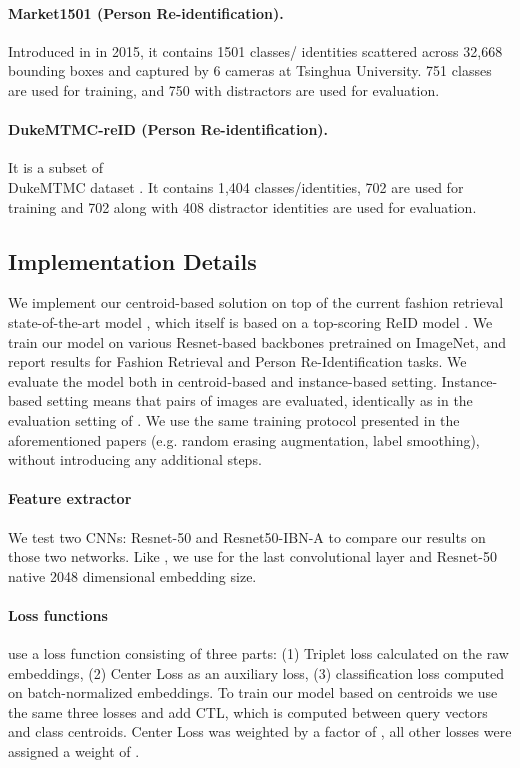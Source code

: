\documentclass[sigconf,nonacm]{acmart}
\begin{document}
\paragraph{Market1501 (Person Re-identification).}
Introduced in \cite{Zheng2015_market1501} in 2015, it contains 1501 classes/ identities scattered across 32,668 bounding boxes and captured by 6 cameras at Tsinghua University. 751 classes are used for training, and 750 with distractors are used for evaluation.


\paragraph{DukeMTMC-reID (Person Re-identification).}
It is a subset of \\ DukeMTMC dataset \cite{Ristani2016_dukemtmcreid}. It contains 1,404 classes/identities, 702 are used for training and 702 along with 408 distractor identities are used for evaluation. 

\subsection{Implementation Details}
We implement our centroid-based solution on top of the current fashion retrieval state-of-the-art model \cite{Wieczorek2020}, which itself is based on a top-scoring ReID model \cite{luo_reid_strong_baseline}. We train our model on various Resnet-based backbones pretrained on ImageNet, and report results for Fashion Retrieval and Person Re-Identification tasks. We evaluate the model both in centroid-based and instance-based setting. Instance-based setting means that pairs of images are evaluated, identically as in the evaluation setting of \cite{Wieczorek2020}. We use the same training protocol presented in the aforementioned papers (e.g. random erasing augmentation, label smoothing), without introducing any additional steps.

\paragraph{Feature extractor}
We test two CNNs: Resnet-50 and Resnet50-IBN-A to compare our results on those two networks. Like \cite{Wieczorek2020, luo_reid_strong_baseline}, we use  for the last convolutional layer and Resnet-50 native 2048 dimensional embedding size.

\paragraph{Loss functions}
\cite{Wieczorek2020, luo_reid_strong_baseline} use a loss function consisting of three parts: (1) Triplet loss calculated on the raw embeddings, (2) Center Loss \cite{Wen2016_a_discriminative_feature} as an auxiliary loss, (3) classification loss computed on batch-normalized embeddings. To train our model based on centroids we use the same three losses and add CTL, which is computed between query vectors and class centroids. Center Loss was weighted by a factor of , all other losses were assigned a weight of .
\end{document}
